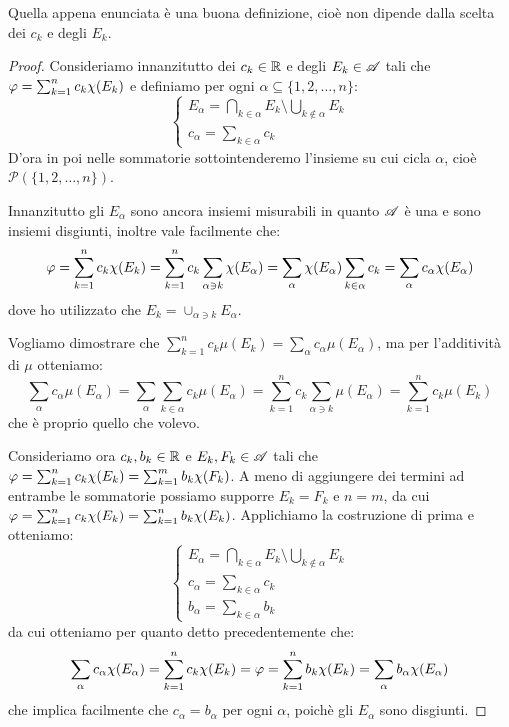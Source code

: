 \begin{remark}
	Quella appena enunciata è una buona definizione, cioè non dipende dalla scelta dei $c_k$ e degli $E_k$.
\end{remark}
\begin{proof}
	Consideriamo innanzitutto dei $c_k\in \mathbb R$ e degli $E_k\in \mathscr A$ tali che $\varphi=\sum_{k=1}^nc_k\chi(E_k)$ e definiamo per ogni $\alpha\subseteq\{1,2,\dots,n\}$:
	\begin{equation*}
		\begin{cases}
			E_\alpha=\bigcap_{k\in\alpha}E_k\setminus \bigcup_{k\not\in \alpha} E_k\\
			c_\alpha=\sum_{k\in\alpha} c_k
		\end{cases}
	\end{equation*}
	D'ora in poi nelle sommatorie sottointenderemo l'insieme su cui cicla $\alpha$, cioè $\mathcal{P}(\{1,2,\dots,n\})$.
	
	Innanzitutto gli $E_\alpha$ sono ancora insiemi misurabili in quanto $\mathscr A$ è una \sigalg{} e sono insiemi disgiunti, inoltre vale facilmente che:
	\begin{equation*}
		\varphi=\sum_{k=1}^nc_k\chi(E_k)=\sum_{k=1}^nc_k\sum_{\alpha\ni k}\chi(E_\alpha)=\sum_\alpha \chi(E_\alpha)\sum_{k\in\alpha}c_k=\sum_\alpha c_\alpha\chi(E_\alpha)
	\end{equation*}
	dove ho utilizzato che $E_k=\cup_{\alpha\ni k} E_\alpha$.

	Vogliamo dimostrare che $\sum_{k=1}^nc_k\mu(E_k)=\sum_{\alpha}c_\alpha\mu(E_\alpha)$, ma per l'additività di $\mu$ otteniamo:
	\begin{equation}\label{RaffinamentoIntegrale}
		\sum_\alpha c_\alpha\mu(E_\alpha)=\sum_\alpha \sum_{k\in\alpha}c_k\mu(E_\alpha)=\sum_{k=1}^n c_k\sum_{\alpha \ni k} \mu(E_\alpha)=\sum_{k=1}^n c_k \mu(E_k)
	\end{equation}
	che è proprio quello che volevo.
	
	Consideriamo ora $c_k, b_k\in\mathbb R$ e $E_k,F_k\in\mathscr A$ tali che $\varphi=\sum_{k=1}^nc_k\chi(E_k)=\sum_{k=1}^mb_k\chi(F_k)$. A meno di aggiungere dei termini ad entrambe le sommatorie possiamo supporre $E_k=F_k$ e $n=m$, da cui $\varphi=\sum_{k=1}^nc_k\chi(E_k)=\sum_{k=1}^nb_k\chi(E_k)$. Applichiamo la costruzione di prima e otteniamo:
	\begin{equation*}
		\begin{cases}
			E_\alpha=\bigcap_{k\in\alpha}E_k\setminus \bigcup_{k\not\in \alpha} E_k\\
			c_\alpha=\sum_{k\in\alpha} c_k\\
			b_\alpha=\sum_{k\in\alpha} b_k
		\end{cases}
	\end{equation*}
	da cui otteniamo per quanto detto precedentemente che:
	\begin{equation}
		\sum_\alpha c_\alpha\chi(E_\alpha)=\sum_{k=1}^nc_k\chi(E_k)=\varphi=\sum_{k=1}^nb_k\chi(E_k)=\sum_\alpha b_\alpha\chi(E_\alpha)
	\end{equation}
	che implica facilmente che $c_\alpha=b_\alpha$ per ogni $\alpha$, poichè gli $E_\alpha$ sono disgiunti.
	

\end{proof}
